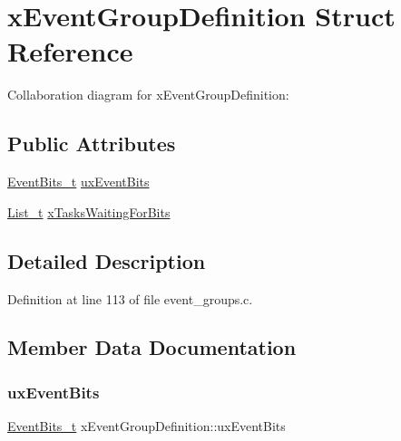 \hypertarget{structx_event_group_definition}{}\section{x\+Event\+Group\+Definition Struct Reference}
\label{structx_event_group_definition}


Collaboration diagram for x\+Event\+Group\+Definition\+:
\subsection*{Public Attributes}
\begin{DoxyCompactItemize}
\item 
\hyperlink{externals_2freertos_2include_2event__groups_8h_ab2f21b93db0b2a0ab64d7a81ff32ac2e}{Event\+Bits\+\_\+t} \hyperlink{structx_event_group_definition_ad7c19a46f5f4557e466209962b5e4610}{ux\+Event\+Bits}
\item 
\hyperlink{externals_2freertos_2include_2list_8h_afd590ef6400071b4d63d65ef90bea7f4}{List\+\_\+t} \hyperlink{structx_event_group_definition_a6570ba98d93dcba9cb03de0c62df9044}{x\+Tasks\+Waiting\+For\+Bits}
\end{DoxyCompactItemize}


\subsection{Detailed Description}


Definition at line 113 of file event\+\_\+groups.\+c.



\subsection{Member Data Documentation}
\mbox{\label{structx_event_group_definition_ad7c19a46f5f4557e466209962b5e4610}} 
\subsubsection{\texorpdfstring{ux\+Event\+Bits}{uxEventBits}}
{\footnotesize\ttfamily \hyperlink{externals_2freertos_2include_2event__groups_8h_ab2f21b93db0b2a0ab64d7a81ff32ac2e}{Event\+Bits\+\_\+t} x\+Event\+Group\+Definition\+::ux\+Event\+Bits}



